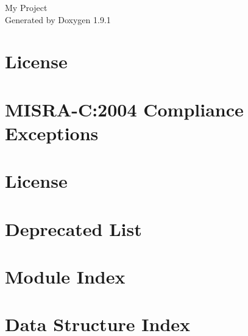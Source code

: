 \let\mypdfximage\pdfximage\def\pdfximage{\immediate\mypdfximage}\documentclass[twoside]{book}
\newcommand{\+}{\discretionary{\mbox{\scriptsize$\hookleftarrow$}}{}{}}
\newcommand{\clearemptydoublepage}{%
  \newpage{\pagestyle{empty}\cleardoublepage}%
}
\begin{document}
\raggedbottom

\hypersetup{pageanchor=false,
             bookmarksnumbered=true,
             pdfencoding=unicode
            }
\begin{titlepage}
\vspace*{7cm}
\begin{center}%
{\Large My Project }\\
\vspace*{1cm}
{\large Generated by Doxygen 1.9.1}\\
\end{center}
\end{titlepage}
\clearemptydoublepage
{}
\tableofcontents
\clearemptydoublepage
{}
\hypersetup{pageanchor=true}

\chapter{License}
\label{md__drivers__c_m_s_i_s__device__s_t__s_t_m32_f1xx__license}

\chapter{MISRA-\/C\+:2004 Compliance Exceptions}
\label{_c_m_s_i_s__m_i_s_r_a__exceptions}

\chapter{License}
\label{md__drivers__s_t_m32_f1xx__h_a_l__driver__license}

\chapter{Deprecated List}
\label{deprecated}

\chapter{Module Index}

\chapter{Data Structure Index}

\end{document}
